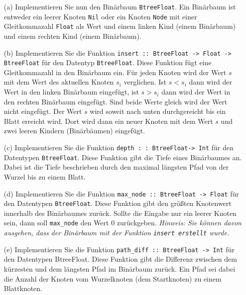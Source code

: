 \begin{itemize}
\item[(a)] Implementieren Sie nun den Binärbaum \texttt{BtreeFloat}. Ein Binärbaum ist 
entweder ein leerer Knoten \texttt{Nil} oder ein Knoten \texttt{Node} mit einer Gleitkommazahl 
\texttt{Float} als Wert und einem linken Kind (einem Binärbaum) und einem rechten Kind 
(einem Binärbaum).

\item[(b)] Implementieren Sie die Funktion \texttt{insert :: BtreeFloat -> Float -> BtreeFloat} 
für den Datentyp \texttt{BtreeFloat}. Diese Funktion fügt 
eine Gleitkommazahl in den Binärbaum ein. Für jeden Knoten wird der Wert $s$ mit
 dem Wert des aktuellen Knoten $s_{i}$ verglichen. Ist $s<s_{i}$ dann wird der Wert 
 in den linken Binärbaum eingefügt, ist $s>s_{i}$ dann wird der Wert in den rechten 
 Binärbaum eingefügt. Sind beide Werte gleich wird der Wert nicht eingefügt. 
 Der Wert $s$ wird soweit nach unten durchgereicht bis ein Blatt erreicht wird. 
 Dort wird dann ein neuer Knoten mit dem Wert $s$ und zwei leeren Kindern 
 (Binärbäumen) eingefügt.

\item[(c)] Implementieren Sie die Funktion \texttt{depth : : BtreeFloat-> Int} 
für den Datentypen \texttt{BtreeFloat}. Diese Funktion gibt die Tiefe eines Binärbaumes an. 
Dabei ist die Tiefe beschrieben durch den maximal längsten Pfad von der Wurzel bis 
zu einem Blatt.

\item[(d)] Implementieren Sie die Funktion \texttt{max_node :: BtreeFloat -> Float}
 für den Datentypen \texttt{BtreeFloat}. Diese Funktion gibt den größten Knotenwert 
innerhalb des Binärbaumes zurück. Sollte die Eingabe nur ein leerer Knoten sein, 
dann soll \texttt{max_node} den Wert 0 zurückgeben. \textit{Hinweis: Sie können davon ausgehen, 
dass der Binärbaum mit der Funktion \texttt{insert erstellt} wurde.}

\item[(e)] Implementieren Sie die Funktion \texttt{path_diff :: BtreeFloat -> Int}
für den Datentypen BtreeFloat. Diese Funktion gibt die Differenz zwischen dem 
kürzesten und dem längsten Pfad im Binärbaum zurück. Ein Pfad sei dabei die Anzahl 
der Knoten vom Wurzelknoten (dem Startknoten) zu einem Blattknoten.
\end{itemize}


